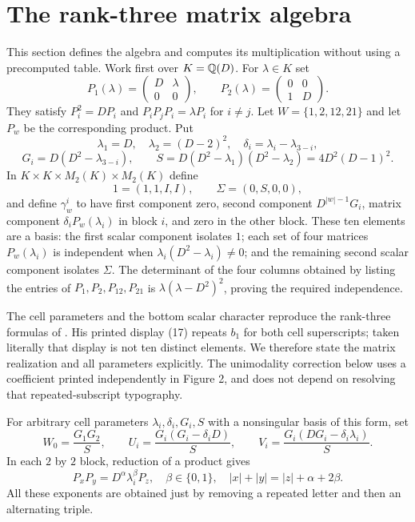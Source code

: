 \documentclass[11pt]{article}
\theoremstyle{definition}\newtheorem{definition}[theorem]{Definition}
\begin{document}


\section{The rank-three matrix algebra}\label{sec:rank3}
This section defines the algebra and computes its multiplication without using a precomputed table. Work first over $K=\mathbb Q(D)$. For $\lambda\in K$ set
\[
 P_1(\lambda)=\begin{pmatrix}D&\lambda\\0&0\end{pmatrix},\qquad
 P_2(\lambda)=\begin{pmatrix}0&0\\1&D\end{pmatrix}.
\]
They satisfy $P_i^2=DP_i$ and $P_iP_jP_i=\lambda P_i$ for $i\ne j$. Let $W=\{1,2,12,21\}$ and let $P_w$ be the corresponding product. Put
\[
 \lambda_1=D,\quad\lambda_2=(D-2)^2,\quad
 \delta_i=\lambda_i-\lambda_{3-i},
\]
\[
 G_i=D(D^2-\lambda_{3-i}),\qquad
 S=D(D^2-\lambda_1)(D^2-\lambda_2)=4D^2(D-1)^2.
\]
In $K\times K\times M_2(K)\times M_2(K)$ define
\[
 1=(1,1,I,I),\qquad\Sigma=(0,S,0,0),
\]
and define $\gamma_w^i$ to have first component zero, second component $D^{|w|-1}G_i$, matrix component $\delta_iP_w(\lambda_i)$ in block $i$, and zero in the other block. These ten elements are a basis: the first scalar component isolates $1$; each set of four matrices $P_w(\lambda_i)$ is independent when $\lambda_i(D^2-\lambda_i)\ne0$; and the remaining second scalar component isolates $\Sigma$. The determinant of the four columns obtained by listing the entries of $P_1,P_2,P_{12},P_{21}$ is $\lambda(\lambda-D^2)^2$, proving the required independence.

The cell parameters and the bottom scalar character reproduce the rank-three formulas of \citet[\S5.1 and Figure 2]{Mulmuley}. His printed display (17) repeats $b_1$ for both cell superscripts; taken literally that display is not ten distinct elements. We therefore state the matrix realization and all parameters explicitly. The unimodality correction below uses a coefficient printed independently in Figure 2, and does not depend on resolving that repeated-subscript typography.

For arbitrary cell parameters $\lambda_i,\delta_i,G_i,S$ with a nonsingular basis of this form, set
\[
 W_0=\frac{G_1G_2}{S},\qquad
 U_i=\frac{G_i(G_i-\delta_iD)}{S},\qquad
 V_i=\frac{G_i(DG_i-\delta_i\lambda_i)}{S}.
\]
In each $2$ by $2$ block, reduction of a product gives
\[
 P_xP_y=D^\alpha\lambda_i^\beta P_z,
 \quad \beta\in\{0,1\},\quad
 |x|+|y|=|z|+\alpha+2\beta.
\]
All these exponents are obtained just by removing a repeated letter and then an alternating triple.
\end{document}
